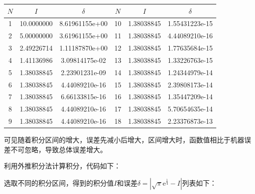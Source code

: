 \documentclass[a4paper]{book}
\begin{document}
\begin{enumerate}
\begin{table}[ht!]
    \begin{center}
    \begin{tabular}{|ccc|ccc|}
        \hline
        $N$ & $I$ & $\delta$ & $N$ & $I$ & $\delta$ \\
        \hline
        1 & 10.0000000 & 8.61961155e+00 & 10 & 1.38038845 & 1.55431223e-15 \\
        2 & 5.00000000 & 3.61961155e+00 & 11 & 1.38038845 & 4.44089210e-16 \\
        3 & 2.49226714 & 1.11187870e+00 & 12 & 1.38038845 & 1.77635684e-15 \\
        4 & 1.41136986 & 3.09814175e-02 & 13 & 1.38038845 & 1.33226763e-15 \\
        5 & 1.38038845 & 2.23901231e-09 & 14 & 1.38038845 & 1.24344979e-14 \\
        6 & 1.38038845 & 4.44089210e-16 & 15 & 1.38038845 & 2.39808173e-14 \\
        7 & 1.38038845 & 6.66133815e-16 & 16 & 1.38038845 & 1.35447209e-14 \\
        8 & 1.38038845 & 4.44089210e-16 & 17 & 1.38038845 & 5.70654635e-14 \\
        9 & 1.38038845 & 4.44089210e-16 & 18 & 1.38038845 & 2.23376873e-13 \\
        \hline
    \end{tabular}
\end{center}
\end{table}

可见随着积分区间的增大，误差先减小后增大，区间增大时，函数值相比于机器误差不可忽略，导致总体误差增大。

利用外推积分法计算积分，代码如下：



选取不同的积分区间，得到的积分值$I$和误差$\delta=\left|\sqrt{\pi}\mathrm{e}^{\tfrac{1}{4}}-I\right|$列表如下：


\end{enumerate}
\end{document}
